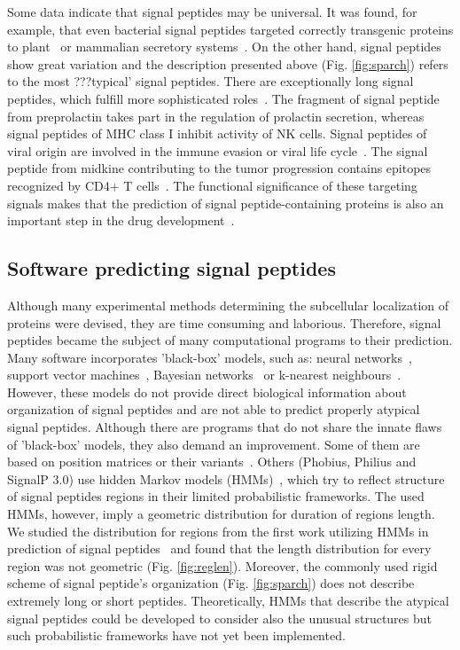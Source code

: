 \documentclass[10pt,letterpaper]{article}
\begin{document}
Some data indicate that signal peptides may be universal. It was found, for example, that even bacterial signal peptides targeted correctly transgenic proteins to plant~\cite{2009moellera} or mammalian secretory systems~\cite{2014naganoestablishment}. On the other hand, signal peptides show great variation and the description presented above (Fig. \ref{fig:sparch}) refers to the most ???typical’ signal peptides. There are  exceptionally long signal peptides, which fulfill more sophisticated roles~\cite{2009hissarchitecture}. The fragment of signal peptide from preprolactin takes part in the regulation of prolactin secretion, whereas signal peptides of MHC class I inhibit activity of NK cells. Signal peptides of viral origin are involved in the immune evasion or viral life cycle~\cite{2000kappposttargeting}. The signal peptide from midkine contributing to the tumor progression contains epitopes recognized by CD4+ T cells~\cite{2013kerzerhothe}. The functional significance of these targeting signals makes that the prediction of signal peptide-containing proteins is also an important step in the drug development~\cite{2005zhangalteration, 2012netoadeimproving, 2010moellerwetmilling}.


\subsection*{Software predicting signal peptides}

Although many experimental methods determining the subcellular localization of proteins were devised, they are time consuming and laborious. Therefore, signal peptides became the subject of many computational programs to their prediction. Many software incorporates 'black-box’ models, such as: neural networks~\cite{2011petersensignalp}, support vector machines~\cite{2014zhangprediction}, Bayesian networks~\cite{2012zhengsignalbnf} or k-nearest neighbours~\cite{2007shensignall}. However, these models do not provide direct biological information about organization of signal peptides and are not able to predict properly atypical signal peptides. Although there are programs that do not share the innate flaws of 'black-box' models, they also demand an improvement. Some of them are based on position matrices or their variants~\cite{2014zhangprediction, 2004hillerpredisi}. Others (Phobius, Philius and SignalP 3.0) use hidden Markov models (HMMs)~\cite{2004klla, 2008reynoldstransmembrane, 2004bendtsenimproved}, which try to reflect structure of signal peptides regions in their limited probabilistic frameworks. The used HMMs, however, imply a geometric distribution for duration of regions length. We studied the distribution for regions from the first work utilizing HMMs in prediction of signal peptides~\cite{1998nielsenprediction} and found that the length distribution for every region was not geometric (Fig. \ref{fig:reglen}). Moreover, the commonly used rigid scheme of signal peptide's organization (Fig. \ref{fig:sparch}) does not describe extremely long or short peptides. Theoretically, HMMs that describe the atypical signal peptides could be developed to consider also the unusual structures but such probabilistic frameworks have not yet been implemented.
\end{document}
